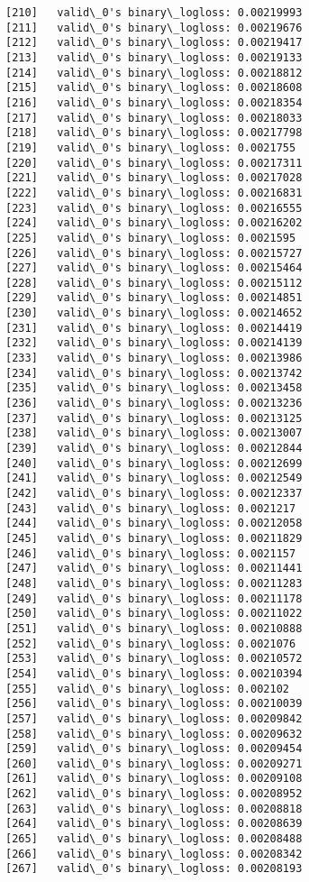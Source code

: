 \documentclass[11pt]{article}
\begin{document}
\begin{Verbatim}[commandchars=\\\{\}]
[210]	valid\_0's binary\_logloss: 0.00219993
[211]	valid\_0's binary\_logloss: 0.00219676
[212]	valid\_0's binary\_logloss: 0.00219417
[213]	valid\_0's binary\_logloss: 0.00219133
[214]	valid\_0's binary\_logloss: 0.00218812
[215]	valid\_0's binary\_logloss: 0.00218608
[216]	valid\_0's binary\_logloss: 0.00218354
[217]	valid\_0's binary\_logloss: 0.00218033
[218]	valid\_0's binary\_logloss: 0.00217798
[219]	valid\_0's binary\_logloss: 0.0021755
[220]	valid\_0's binary\_logloss: 0.00217311
[221]	valid\_0's binary\_logloss: 0.00217028
[222]	valid\_0's binary\_logloss: 0.00216831
[223]	valid\_0's binary\_logloss: 0.00216555
[224]	valid\_0's binary\_logloss: 0.00216202
[225]	valid\_0's binary\_logloss: 0.0021595
[226]	valid\_0's binary\_logloss: 0.00215727
[227]	valid\_0's binary\_logloss: 0.00215464
[228]	valid\_0's binary\_logloss: 0.00215112
[229]	valid\_0's binary\_logloss: 0.00214851
[230]	valid\_0's binary\_logloss: 0.00214652
[231]	valid\_0's binary\_logloss: 0.00214419
[232]	valid\_0's binary\_logloss: 0.00214139
[233]	valid\_0's binary\_logloss: 0.00213986
[234]	valid\_0's binary\_logloss: 0.00213742
[235]	valid\_0's binary\_logloss: 0.00213458
[236]	valid\_0's binary\_logloss: 0.00213236
[237]	valid\_0's binary\_logloss: 0.00213125
[238]	valid\_0's binary\_logloss: 0.00213007
[239]	valid\_0's binary\_logloss: 0.00212844
[240]	valid\_0's binary\_logloss: 0.00212699
[241]	valid\_0's binary\_logloss: 0.00212549
[242]	valid\_0's binary\_logloss: 0.00212337
[243]	valid\_0's binary\_logloss: 0.0021217
[244]	valid\_0's binary\_logloss: 0.00212058
[245]	valid\_0's binary\_logloss: 0.00211829
[246]	valid\_0's binary\_logloss: 0.0021157
[247]	valid\_0's binary\_logloss: 0.00211441
[248]	valid\_0's binary\_logloss: 0.00211283
[249]	valid\_0's binary\_logloss: 0.00211178
[250]	valid\_0's binary\_logloss: 0.00211022
[251]	valid\_0's binary\_logloss: 0.00210888
[252]	valid\_0's binary\_logloss: 0.0021076
[253]	valid\_0's binary\_logloss: 0.00210572
[254]	valid\_0's binary\_logloss: 0.00210394
[255]	valid\_0's binary\_logloss: 0.002102
[256]	valid\_0's binary\_logloss: 0.00210039
[257]	valid\_0's binary\_logloss: 0.00209842
[258]	valid\_0's binary\_logloss: 0.00209632
[259]	valid\_0's binary\_logloss: 0.00209454
[260]	valid\_0's binary\_logloss: 0.00209271
[261]	valid\_0's binary\_logloss: 0.00209108
[262]	valid\_0's binary\_logloss: 0.00208952
[263]	valid\_0's binary\_logloss: 0.00208818
[264]	valid\_0's binary\_logloss: 0.00208639
[265]	valid\_0's binary\_logloss: 0.00208488
[266]	valid\_0's binary\_logloss: 0.00208342
[267]	valid\_0's binary\_logloss: 0.00208193

\end{Verbatim}
\end{document}
